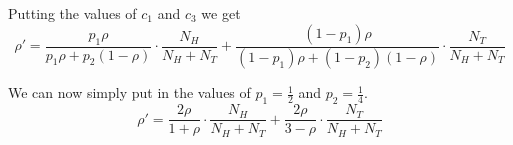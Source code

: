 \documentclass{article}
\begin{document}
Putting the values of $c_1$ and $c_3$ we get
\begin{equation}
  \label{eq:9}
  \rho' = \frac{p_1 \rho}{p_1 \rho + p_2 (1 - \rho)}\cdot \frac{N_H}{N_H + N_T} + \frac{(1 - p_1)\rho}{(1-p_1) \rho + (1 - p_2) (1 - \rho)}\cdot \frac{N_T}{N_H + N_T}
\end{equation}

We can now simply put in the values of $p_1 = \frac{1}{2}$ and $p_2 = \frac{1}{4}$.
\begin{equation}
  \label{eq:10}
  \rho' = \frac{2\rho}{1+\rho}\cdot \frac{N_H}{N_H + N_T} + \frac{2\rho}{3 - \rho}\cdot \frac{N_T}{N_H + N_T}
\end{equation}
\end{document}
